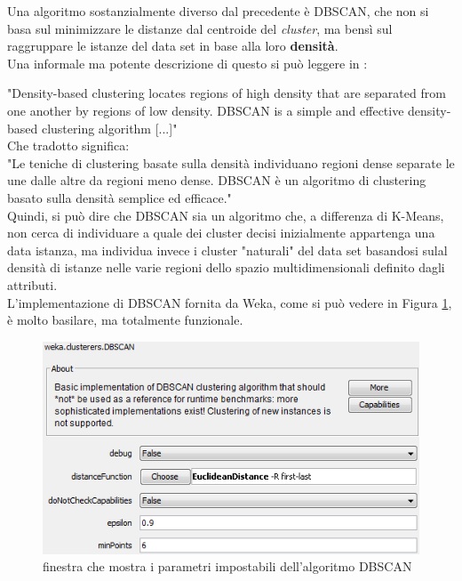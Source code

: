        Una algoritmo sostanzialmente diverso dal precedente è DBSCAN, che non si basa sul minimizzare le distanze dal centroide del \textit{cluster}, ma bensì sul raggruppare le istanze del data set in base alla loro \textbf{densità}. \\

        Una informale ma potente descrizione di questo si può leggere in \cite{dispense}:

        "Density-based clustering locates regions of high density that are separated from one another by regions of low density. DBSCAN is a simple and effective density-based clustering algorithm [...]"\\

        Che tradotto significa:\\

        "Le teniche di clustering basate sulla densità individuano regioni dense separate le une dalle altre da regioni meno dense. DBSCAN è un algoritmo di clustering basato sulla densità semplice ed efficace."\\

        Quindi, si può dire che DBSCAN sia un algoritmo che, a differenza di K-Means, non cerca di individuare a quale dei cluster decisi inizialmente appartenga una data istanza, ma individua invece i cluster "naturali" del data set basandosi sulal densità di istanze nelle varie regioni dello spazio multidimensionali definito dagli attributi. \\

        L'implementazione di DBSCAN fornita da Weka, come si può vedere in Figura \ref{dbscan_weka}, è molto basilare, ma totalmente funzionale.

        \begin{figure}
            \centering
            \caption{finestra che mostra i parametri impostabili dell'algoritmo DBSCAN}
            \label{dbscan_weka}
            \includegraphics[scale=0.55]{img/dbscan_weka.png}
        \end{figure}

